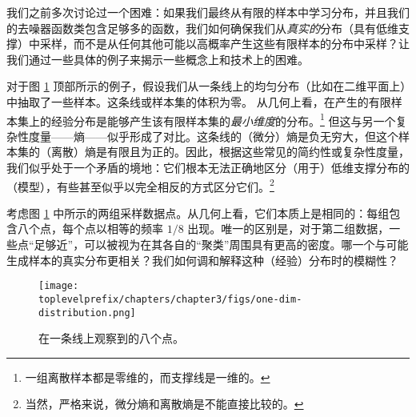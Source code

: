 \documentclass[../../book-main_zh.tex]{subfiles}
\begin{document}
我们之前多次讨论过一个困难：如果我们最终从有限的样本中学习分布，并且我们的去噪器函数类包含足够多的函数，我们如何确保我们从\textit{真实的}分布（具有低维支撑）中采样，而不是从任何其他可能以高概率产生这些有限样本的分布中采样？让我们通过一些具体的例子来揭示一些概念上和技术上的困难。

\begin{example}[体积、维度和熵]\label{eg:measures-of-complexity}
对于图 \ref{fig:1d-line} 顶部所示的例子，假设我们从一条线上的均匀分布（比如在二维平面上）中抽取了一些样本。这条线或样本集的体积为零。
从几何上看，在产生的有限样本集上的经验分布是能够产生该有限样本集的{\em 最小维度}的分布。\footnote{一组离散样本都是零维的，而支撑线是一维的。} 但这与另一个复杂性度量——熵——似乎形成了对比。这条线的（微分）熵是负无穷大，但这个样本集的（离散）熵是有限且为正的。因此，根据这些常见的简约性或复杂性度量，我们似乎处于一个矛盾的境地：它们根本无法正确地区分（用于）低维支撑分布的（模型），有些甚至似乎以完全相反的方式区分它们。\footnote{当然，严格来说，微分熵和离散熵是不能直接比较的。}
\end{example}

\begin{example}[密度]\label{eg:density} 考虑图 \ref{fig:1d-line} 中所示的两组采样数据点。从几何上看，它们本质上是相同的：每组包含八个点，每个点以相等的频率 $1/8$ 出现。唯一的区别是，对于第二组数据，一些点“足够近”，可以被视为在其各自的“聚类”周围具有更高的密度。哪一个与可能生成样本的真实分布更相关？我们如何调和解释这种（经验）分布时的模糊性？
\begin{figure}[t]
	\centering
	\texttt{[image: \\toplevelprefix/chapters/chapter3/figs/one-dim-distribution.png]}
	\caption{在一条线上观察到的八个点。}
	\label{fig:1d-line}
\end{figure}
\end{example}


\end{document}
